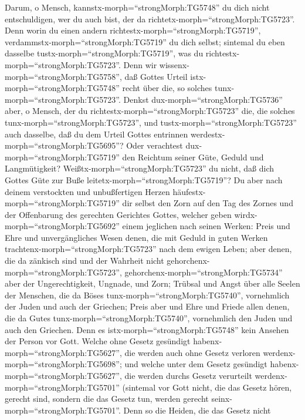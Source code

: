  Darum, o Mensch, kannstx-morph=``strongMorph:TG5748'' du
dich nicht entschuldigen, wer du auch bist, der da
richtetx-morph=``strongMorph:TG5723''. Denn worin du einen andern
richtestx-morph=``strongMorph:TG5719'',
verdammstx-morph=``strongMorph:TG5719'' du dich selbst; sintemal du eben
dasselbe tustx-morph=``strongMorph:TG5719'', was du
richtestx-morph=``strongMorph:TG5723''.  Denn wir
wissenx-morph=``strongMorph:TG5758'', daß Gottes Urteil
istx-morph=``strongMorph:TG5748'' recht über die, so solches
tunx-morph=``strongMorph:TG5723''.  Denkst
dux-morph=``strongMorph:TG5736'' aber, o Mensch, der du
richtestx-morph=``strongMorph:TG5723'' die, die solches
tunx-morph=``strongMorph:TG5723'', und
tustx-morph=``strongMorph:TG5723'' auch dasselbe, daß du dem Urteil
Gottes entrinnen werdestx-morph=``strongMorph:TG5695''? 
Oder verachtest dux-morph=``strongMorph:TG5719'' den Reichtum seiner
Güte, Geduld und Langmütigkeit? Weißtx-morph=``strongMorph:TG5723'' du
nicht, daß dich Gottes Güte zur Buße
leitetx-morph=``strongMorph:TG5719''?  Du aber nach deinem
verstockten und unbußfertigen Herzen
häufestx-morph=``strongMorph:TG5719'' dir selbst den Zorn auf den Tag
des Zornes und der Offenbarung des gerechten Gerichtes Gottes,
 welcher geben wirdx-morph=``strongMorph:TG5692'' einem
jeglichen nach seinen Werken:  Preis und Ehre und
unvergängliches Wesen denen, die mit Geduld in guten Werken
trachtenx-morph=``strongMorph:TG5723'' nach dem ewigen Leben;
 aber denen, die da zänkisch sind und der Wahrheit nicht
gehorchenx-morph=``strongMorph:TG5723'',
gehorchenx-morph=``strongMorph:TG5734'' aber der Ungerechtigkeit,
Ungnade, und Zorn;  Trübsal und Angst über alle Seelen der
Menschen, die da Böses tunx-morph=``strongMorph:TG5740'', vornehmlich
der Juden und auch der Griechen;  Preis aber und Ehre und
Friede allen denen, die da Gutes tunx-morph=``strongMorph:TG5740'',
vornehmlich den Juden und auch den Griechen.  Denn es
istx-morph=``strongMorph:TG5748'' kein Ansehen der Person vor Gott.
 Welche ohne Gesetz gesündigt
habenx-morph=``strongMorph:TG5627'', die werden auch ohne Gesetz
verloren werdenx-morph=``strongMorph:TG5698''; und welche unter dem
Gesetz gesündigt habenx-morph=``strongMorph:TG5627'', die werden durchs
Gesetz verurteilt werdenx-morph=``strongMorph:TG5701'' 
(sintemal vor Gott nicht, die das Gesetz hören, gerecht sind, sondern
die das Gesetz tun, werden gerecht seinx-morph=``strongMorph:TG5701''.
 Denn so die Heiden, die das Gesetz nicht
